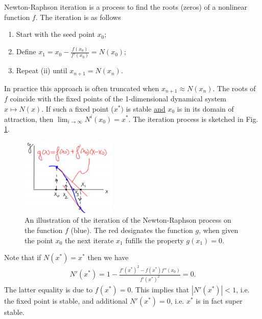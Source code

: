 \begin{ex}
	Newton-Raphson iteration is a process to find the roots (zeros) of a nonlinear function $f$. The iteration is as follows
	\begin{enumerate}
		\item Start with the seed point $x_0$;
		\item Define $x_1 = x_0 - \frac{f(x_0)}{f'(x_0)}= N(x_0)$;
		\item Repeat (ii) until $x_{n+1} = N(x_{n})$.
	\end{enumerate}
	In practice this approach is often truncated when $x_{n+1}\approx N(x_{n})$. The roots of $f$ coincide with the fixed points of the 1-dimensional dynamical system $x \mapsto N(x)$. If such a fixed point ($x^{*})$ is stable \underline{and} $x_0 $ is in its domain of attraction, then $\lim_{i\to \infty }N^{i}(x_0)= x^{*}$. The iteration process is sketched in Fig. \ref{fig:NR_iteration}.
\begin{figure}[h!]
	\centering
	\includegraphics[width=0.4\textwidth]{figures/ch7/1NR_iteration.png}
	\caption{An illustration of the iteration of the Newton-Raphson process on the function $f$ (blue). The red designates the function $g$, when given the point $x_0$ the next iterate $x_1$ fufills the property $g(x_1)=0$.}
	\label{fig:NR_iteration}
\end{figure}

Note that if $N(x^{*}) = x^{*}$ then we have
\begin{align}
	N'(x^{*}) = 1 - \frac{f'(x^{*})^{2} - f(x^{*})f''(x_0)}{f'(x^{*})^{2}}=0.
\end{align}
The latter equality is due to $f(x^{*}) = 0$. This implies that $|N'(x^{*})|<1$, i.e. the fixed point is stable, and additional $N'(x^{*})=0$, i.e. $x^{*}$ is in fact super stable.


\end{ex}
